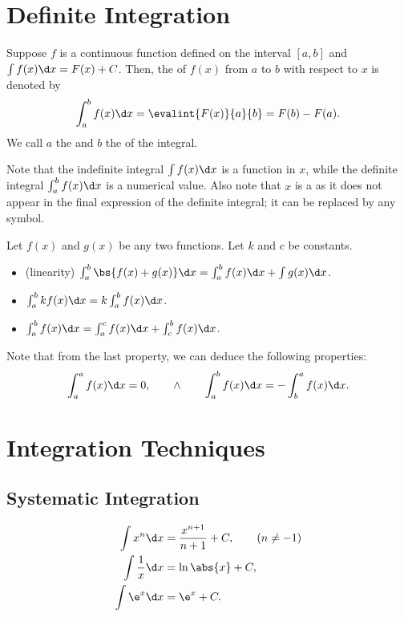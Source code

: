 \section{Definite Integration}

\begin{definition}
    Suppose $f$ is a continuous function defined on the interval $[a, b]$ and $\int f(x) \d x = F(x) + C$. Then, the  of $f(x)$ from $a$ to $b$ with respect to $x$ is denoted by \[\int_a^b f(x) \d x = \evalint{F(x)}{a}{b} = F(b) - F(a).\] We call $a$ the  and $b$ the  of the integral.
\end{definition}

Note that the indefinite integral $\int f(x) \d x$ is a function in $x$, while the definite integral $\int_a^b f(x) \d x$ is a numerical value. Also note that $x$ is a  as it does not appear in the final expression of the definite integral; it can be replaced by any symbol.

\begin{fact}
    Let $f(x)$ and $g(x)$ be any two functions. Let $k$ and $c$ be constants.
    \begin{itemize}
        \item (linearity) $\int_a^b \bs{f(x) + g(x)} \d x = \int_a^b f(x) \d x + \int g(x) \d x$.
        \item $\int_a^b k f(x) \d x = k \int_a^b f(x) \d x$.
        \item $\int_a^b f(x) \d x = \int_a^c f(x) \d x + \int_c^b f(x) \d x$.
    \end{itemize}
\end{fact}

Note that from the last property, we can deduce the following properties: \[\int_a^a f(x) \d x = 0, \qquad \land \qquad \int_a^b f(x) \d x = -\int_b^a f(x) \d x.\]

\section{Integration Techniques}

\subsection{Systematic Integration}

\begin{proposition}
    \begin{align*}
        \int x^n \d x &= \frac{x^{n+1}}{n+1} + C, \tag{$n \neq -1$}\\
        \int \frac1x \d x &= \ln \abs{x} + C,\\
        \int \e^x \d x &= \e^x + C.
    \end{align*}
\end{proposition}

